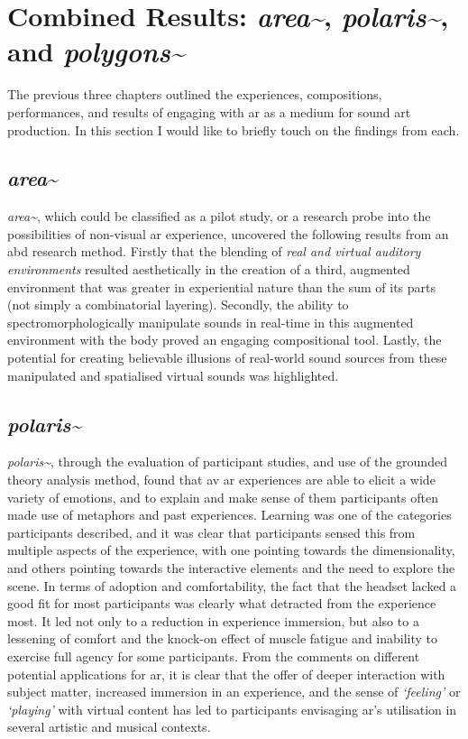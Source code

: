 \section{Combined Results: \textit{area\textasciitilde{}}, \textit{polaris\textasciitilde{}}, and \textit{polygons\textasciitilde{}}}\label{sec: discussion-medium}

The previous three chapters outlined the experiences, compositions, performances, and results of engaging with \gls{ar} as a medium for sound \gls{art} production. In this section I would like to briefly touch on the findings from each.

\subsection{\textit{area\textasciitilde{}}}
\textit{area\textasciitilde{}}, which could be classified as a pilot study, or a research probe into the possibilities of non-visual \gls{ar} experience, uncovered the following results from an \gls{abd} research method. Firstly that the blending of \textit{real and virtual auditory environments} resulted aesthetically in the creation of a third, augmented environment that was greater in experiential nature than the sum of its parts (not simply a combinatorial layering). Secondly, the ability to spectromorphologically manipulate sounds in real-time in this augmented environment with the body proved an engaging compositional tool. Lastly, the potential for creating believable illusions of real-world sound sources from these manipulated and spatialised virtual sounds was highlighted.

\subsection{\textit{polaris\textasciitilde{}}}
\textit{polaris\textasciitilde{}}, through the evaluation of participant studies, and use of the grounded theory analysis method, found that \gls{av} \gls{ar} experiences are able to elicit a wide variety of emotions, and to explain and make sense of them participants often made use of metaphors and past experiences. Learning was one of the categories participants described, and it was clear that participants sensed this from multiple aspects of the experience, with one pointing towards the dimensionality, and others pointing towards the interactive elements and the need to explore the scene. In terms of adoption and comfortability, the fact that the headset lacked a good fit for most participants was clearly what detracted from the experience most. It led not only to a reduction in experience immersion, but also to a lessening of comfort and the knock-on effect of muscle fatigue and inability to exercise full agency for some participants. From the comments on different potential applications for \gls{ar}, it is clear that the offer of deeper interaction with subject matter, increased immersion in an experience, and the sense of \textit{`feeling'} or \textit{`playing'} with virtual content has led to participants envisaging \gls{ar}'s utilisation in several artistic and musical contexts. 

